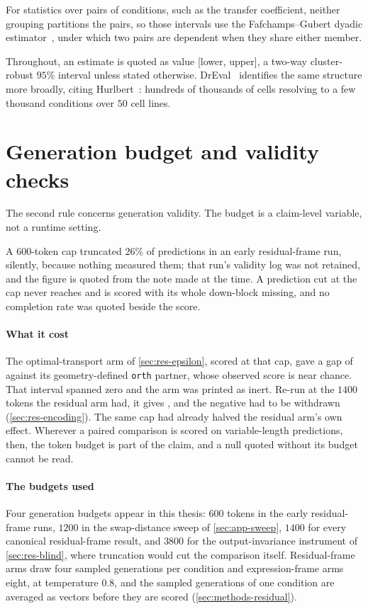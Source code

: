 For statistics over pairs of conditions, such as the transfer coefficient,
neither grouping partitions the pairs, so those intervals use the Fafchamps--Gubert dyadic estimator~\cite{fafchamps2007dyadic}, under which two pairs are dependent when
they share either member.

Throughout, an estimate is quoted as value [lower, upper], a two-way
cluster-robust $95\%$ interval unless stated otherwise. DrEval~\cite{dreval}
identifies the same structure more broadly, citing Hurlbert~\cite{hurlbert}:
hundreds of thousands of cells resolving to a few thousand conditions over $50$ cell lines.

\section{Generation budget and validity checks}

The second rule concerns generation validity. The budget is a claim-level
variable, not a runtime setting.

A $600$-token cap truncated $26\%$ of predictions in an early residual-frame run, silently, because nothing measured them; that run's validity log was not retained, and the figure is quoted from the note made at the time. A prediction cut at the cap never reaches \DOWN{}
and is scored with its whole down-block missing, and no completion rate was
quoted beside the score.

\paragraph{What it cost} The optimal-transport arm of
\cref{sec:res-epsilon}, scored at that cap, gave a gap of
 against its geometry-defined \texttt{orth}
partner, whose observed score is near chance. That interval spanned zero and the
arm was printed as inert. Re-run at the $1400$
tokens the residual arm had, it gives , and the
negative had to be withdrawn (\cref{sec:res-encoding}). The same cap had already
halved the residual arm's own effect. Wherever a paired comparison is scored on
variable-length predictions, then, the token budget is part of the claim, and a
null quoted without its budget cannot be read.

\paragraph{The budgets used} Four generation budgets appear in this thesis: $600$ tokens in the early residual-frame runs, $1200$ in the swap-distance sweep of \cref{sec:app-sweep}, $1400$ for every canonical residual-frame result, and $3800$ for the output-invariance instrument of \cref{sec:res-blind}, where truncation would cut the comparison itself. Residual-frame arms draw four sampled generations per condition and expression-frame arms eight, at temperature $0.8$, and the sampled generations of one condition are averaged as vectors before they are scored (\cref{sec:methods-residual}).

